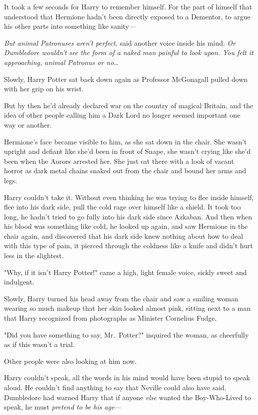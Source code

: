 It took a few seconds for Harry to remember himself. For the part of himself 
that understood that Hermione hadn't been directly exposed to a Dementor, to 
argue his other parts into something like sanity---

\emph{But animal Patronuses aren't perfect,} said another voice inside his 
mind. \emph{Or Dumbledore wouldn't see the form of a naked man painful to look 
upon. You felt it approaching, animal Patronus or no{\ldots}}

Slowly, Harry Potter sat back down again as Professor McGonagall pulled down 
with her grip on his wrist.

But by then he'd already declared war on the country of magical Britain, and 
the idea of other people calling him a Dark Lord no longer seemed important one 
way or another.

Hermione's face became visible to him, as she sat down in the chair. She wasn't 
upright and defiant like she'd been in front of Snape, she wasn't crying like 
she'd been when the Aurors arrested her. She just sat there with a look of 
vacant horror as dark metal chains snaked out from the chair and bound her arms 
and legs.

Harry couldn't take it. Without even thinking he was trying to flee inside 
himself, flee into his dark side, pull the cold rage over himself like a 
shield. It took too long, he hadn't tried to go fully into his dark side since 
Azkaban. And then when his blood was something like cold, he looked up again, 
and saw Hermione in the chair again, and discovered that his dark side knew 
nothing about how to deal with this type of pain, it pierced through the 
coldness like a knife and didn't hurt less in the slightest.

"Why, if it isn't Harry Potter!" came a high, light female voice, sickly sweet 
and indulgent.

Slowly, Harry turned his head away from the chair and saw a smiling woman 
wearing so much makeup that her skin looked almost pink, sitting next to a man 
that Harry recognized from photographs as Minister Cornelius Fudge.

"Did you have something to say, Mr.~Potter?" inquired the woman, as cheerfully 
as if this wasn't a trial.

Other people were also looking at him now.

Harry couldn't speak, all the words in his mind would have been stupid to speak 
aloud. He couldn't find anything to say that Neville could also have said. 
Dumbledore had warned Harry that if anyone \emph{else} wanted the Boy-Who-Lived 
to speak, he must \emph{pretend to be his age}---

